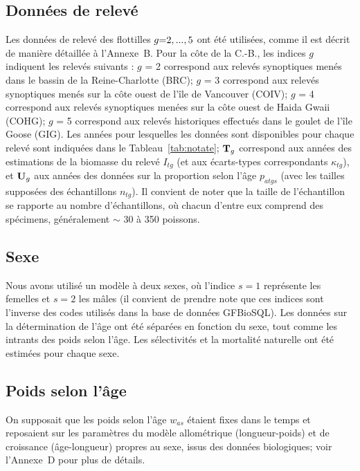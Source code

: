 \documentclass[11pt]{book}
\newcommand{\AppSurv}{Annexe~B}
\newcommand{\AppBio}{Annexe~D}
\begin{document}
\subsection{Donn\'{e}es de relev\'{e}}
Les donn\'{e}es de relev\'{e} des flottilles $g{=}2,...,5$ ont \'{e}t\'{e} utilis\'{e}es, comme il est d\'{e}crit de mani\`{e}re d\'{e}taill\'{e}e \`{a} l'\AppSurv{}.
Pour la c\^{o}te de la C.-B., les indices $g$ indiquent les relev\'{e}s suivants : $g$ = 2 correspond aux relev\'{e}s synoptiques men\'{e}s dans le bassin de la Reine-Charlotte (BRC);  $g$ = 3 correspond aux relev\'{e}s synoptiques men\'{e}s sur la c\^{o}te ouest de l'\^{i}le de Vancouver (COIV);  $g$ = 4 correspond aux relev\'{e}s synoptiques men\'{e}es sur la c\^{o}te ouest de Haida Gwaii (COHG);  $g$ = 5 correspond aux relev\'{e}s historiques effectu\'{e}s dans le goulet de l'\^{i}le Goose (GIG).
Les ann\'{e}es pour lesquelles les donn\'{e}es sont disponibles pour chaque relev\'{e} sont indiqu\'{e}es dans le Tableau~\ref{tab:notate};
${\bf T}_g$ correspond aux ann\'{e}es des estimations de la biomasse du relev\'{e} $I_{tg}$ (et aux \'{e}carts-types correspondants $\kappa_{tg}$), et ${\bf U}_g$ aux ann\'{e}es des donn\'{e}es sur la proportion selon l'\^{a}ge $p_{atgs}$ (avec les tailles suppos\'{e}es des \'{e}chantillons $n_{tg}$).
Il convient de noter que la taille de l'\'{e}chantillon se rapporte au nombre d'\'{e}chantillons, o\`{u} chacun d'entre eux comprend des sp\'{e}cimens, g\'{e}n\'{e}ralement $\sim$ 30 \`{a} 350 poissons.

\subsection{Sexe}

Nous avons utilis\'{e} un mod\`{e}le \`{a} deux sexes, o\`{u} l'indice $s{ = }1$ repr\'{e}sente les femelles et $s{ = }2$ les m\^{a}les (il convient de prendre note que ces indices sont l'inverse des codes utilis\'{e}s dans la base de donn\'{e}es GFBioSQL).
Les donn\'{e}es sur la d\'{e}termination de l'\^{a}ge ont \'{e}t\'{e} s\'{e}par\'{e}es en fonction du sexe, tout comme les intrants des poids selon l'\^{a}ge. Les s\'{e}lectivit\'{e}s et la mortalit\'{e} naturelle ont \'{e}t\'{e} estim\'{e}es pour chaque sexe.

\subsection{Poids selon l'\^{a}ge}

On supposait que les poids selon l'\^{a}ge $w_{as}$ \'{e}taient fixes dans le temps et reposaient sur les param\`{e}tres du mod\`{e}le allom\'{e}trique (longueur-poids) et de croissance (\^{a}ge-longueur) propres au sexe, issus des donn\'{e}es biologiques; voir l'\AppBio{} pour plus de d\'{e}tails.
\end{document}

